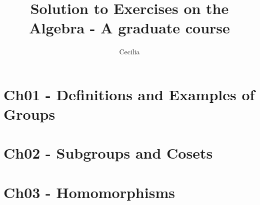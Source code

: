 \documentclass{article}
\title{Solution to Exercises on the \\Algebra - A graduate course}
\author{Cecilia}
\begin{document}
\maketitle

\section*{Ch01 - Definitions and Examples of Groups}

\section*{Ch02 - Subgroups and Cosets}

\section*{Ch03 - Homomorphisms}
\end{document}
